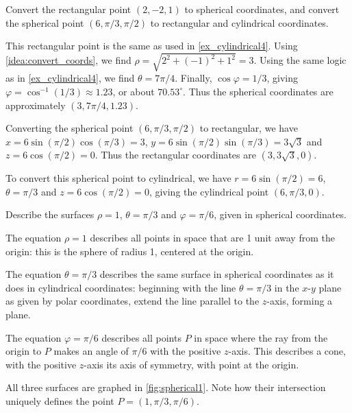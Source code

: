 
{Convert the rectangular point $(2,-2,1)$ to spherical coordinates, and convert the spherical point $(6,\pi/3,\pi/2)$ to rectangular and cylindrical coordinates.}
{This rectangular point is the same as used in \autoref{ex_cylindrical4}. Using \autoref{idea:convert_coords}, we find $\rho = \sqrt{2^2+(-1)^2+1^2} = 3$. Using the same logic as in \autoref{ex_cylindrical4}, we find $\theta = 7\pi/4$. Finally, $\cos\varphi = 1/3$, giving $\varphi = \cos^{-1}(1/3) \approx 1.23$, or about $70.53^\circ$. Thus the spherical coordinates are approximately $(3,7\pi/4,1.23)$.

Converting the spherical point $(6,\pi/3,\pi/2)$ to rectangular, we have $x = 6\sin(\pi/2)\cos(\pi/3) = 3$, $y = 6\sin(\pi/2)\sin(\pi/3) = 3\sqrt{3}$ and $z = 6\cos(\pi/2) = 0$. Thus the rectangular coordinates are $(3,3\sqrt{3},0)$.

To convert this spherical point to cylindrical, we have $r = 6\sin(\pi/2) = 6$, $\theta = \pi/3$ and $z = 6\cos(\pi/2) =0$, giving the cylindrical point $(6,\pi/3,0)$.}

{Describe the surfaces $\rho=1$, $\theta = \pi/3$ and $\varphi = \pi/6$, given in spherical coordinates.}
{The equation $\rho = 1$ describes all points in space that are 1 unit away from the origin: this is the sphere of radius 1, centered at the origin.

The equation $\theta = \pi/3$ describes the same surface in spherical coordinates as it does in cylindrical coordinates: beginning with the line $\theta = \pi/3$ in the $x$-$y$ plane as given by polar coordinates, extend the line parallel to the $z$-axis, forming a plane.

The equation $\varphi=\pi/6$ describes all points $P$ in space where the ray from the origin to $P$ makes an angle of $\pi/6$ with the positive $z$-axis. This describes a cone, with the positive $z$-axis its axis of symmetry, with point at the origin.
%

All three surfaces are graphed in \autoref{fig:spherical1}. Note how their intersection uniquely defines the point $P=(1,\pi/3,\pi/6)$.}

